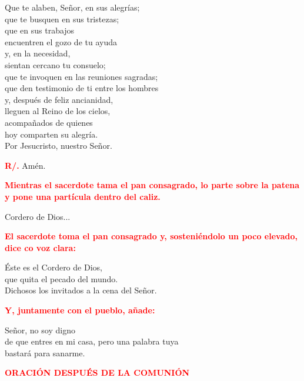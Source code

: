 \documentclass[12pt, letterpaper, spanish]{report}
\begin{document}
Que te alaben, Se\~nor, en sus alegr\'ias;\\
que te busquen en sus tristezas;\\
que en sus trabajos\\
encuentren el gozo de tu ayuda\\
y, en la necesidad,\\
sientan cercano tu consuelo;\\
que te invoquen en las reuniones sagradas;\\
que den testimonio de ti entre los hombres\\
y, despu\'es de feliz ancianidad,\\
lleguen al Reino de los cielos,\\
acompa\~nados de quienes\\
hoy comparten su alegr\'ia.\\
Por Jesucristo, nuestro Se\~nor.\newline

\Large \hspace{-0.9cm} {\bfseries \textcolor{red}{R/.}} \hspace{0.5cm} Am\'en.\newline

\large{\bfseries \textcolor{red}{Mientras el sacerdote tama el pan consagrado, lo parte sobre la patena y pone una part\'icula dentro del caliz.}}\newline

\Large Cordero de Dios...\newline

\large{\bfseries \textcolor{red}{El sacerdote toma el pan consagrado y, sosteni\'endolo un poco elevado, dice co voz clara:}}\newline

\Large \'Este es el Cordero de Dios,\\
que quita el pecado del mundo.\\
Dichosos los invitados a la cena del Se\~nor.\newline

\newpage

\large{\bfseries \textcolor{red}{Y, juntamente con el pueblo, a\~nade:}}\newline

\Large Se\~nor, no soy digno\\
de que entres en mi casa,
pero una palabra tuya\\
bastar\'a para sanarme.\newline

\Large {\bfseries \textcolor{red}{ORACI\'ON DESPU\'ES DE LA COMUNI\'ON}} \newline
\end{document}
